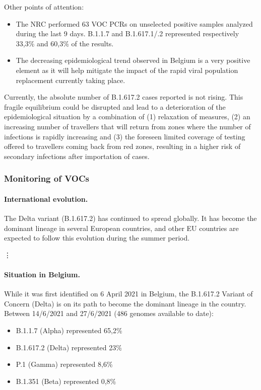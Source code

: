 Other points of attention:
\begin{itemize}
  \item The NRC performed 63 VOC PCRs on unselected positive samples analyzed during the last 9 days.
B.1.1.7 and B.1.617.1/.2 represented respectively 33,3\% and 60,3\% of the results.
  \item The decreasing epidemiological trend observed in Belgium is a very positive element as it will help
mitigate the impact of the rapid viral population replacement currently taking place.
\end{itemize}

Currently, the absolute number of B.1.617.2 cases reported is not rising.
This fragile equilibrium could be disrupted and lead to a deterioration of the epidemiological situation by a combination of (1) relaxation of measures, (2) an increasing number of travellers that will return from zones where the number of infections is rapidly increasing and (3) the foreseen limited coverage of testing offered to travellers coming back from red zones, resulting in a higher risk of secondary infections after importation of cases.

\subsubsection{Monitoring of VOCs}
\paragraph*{International evolution.}
The Delta variant (B.1.617.2) has continued to spread globally.
It has become the dominant lineage in several European countries, and other EU countries are expected to follow this evolution during the summer period.

\vdots

\paragraph*{Situation in Belgium.}
While it was first identified on 6 April 2021 in Belgium, the B.1.617.2 Variant of Concern (Delta) is on its path to become the dominant lineage in the country.
Between 14/6/2021 and 27/6/2021 (486 genomes available to date):
\begin{itemize}
  \item B.1.1.7 (Alpha) represented 65,2\%
  \item B.1.617.2 (Delta) represented 23\%
  \item P.1 (Gamma) represented 8,6\%
  \item B.1.351 (Beta) represented 0,8\%
\end{itemize}

